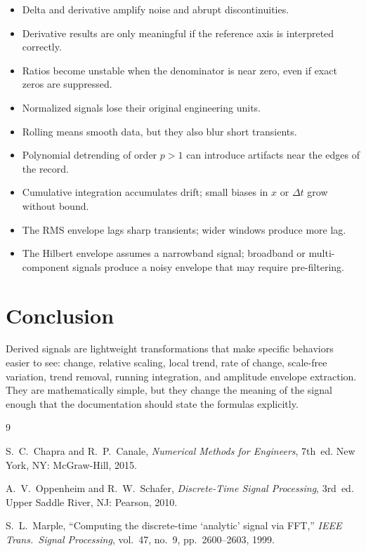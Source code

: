 \documentclass[11pt,a4paper]{article}
\begin{document}
\begin{itemize}
    \item Delta and derivative amplify noise and abrupt discontinuities.
    \item Derivative results are only meaningful if the reference axis is interpreted correctly.
    \item Ratios become unstable when the denominator is near zero, even if exact zeros are suppressed.
    \item Normalized signals lose their original engineering units.
    \item Rolling means smooth data, but they also blur short transients.
    \item Polynomial detrending of order $p > 1$ can introduce artifacts near the edges of the record.
    \item Cumulative integration accumulates drift; small biases in $x$ or $\Delta t$ grow without bound.
    \item The RMS envelope lags sharp transients; wider windows produce more lag.
    \item The Hilbert envelope assumes a narrowband signal; broadband or multi-component signals produce a noisy envelope that may require pre-filtering.
\end{itemize}

\section{Conclusion}

Derived signals are lightweight transformations that make specific behaviors easier to see: change, relative scaling, local trend, rate of change, scale-free variation, trend removal, running integration, and amplitude envelope extraction. They are mathematically simple, but they change the meaning of the signal enough that the documentation should state the formulas explicitly.

\begin{thebibliography}{9}

S.~C.~Chapra and R.~P.~Canale,
\emph{Numerical Methods for Engineers}, 7th~ed.
New York, NY: McGraw-Hill, 2015.

A.~V.~Oppenheim and R.~W.~Schafer,
\emph{Discrete-Time Signal Processing}, 3rd~ed.
Upper Saddle River, NJ: Pearson, 2010.

S.~L.~Marple,
``Computing the discrete-time `analytic' signal via FFT,''
\emph{IEEE Trans.\ Signal Processing}, vol.~47, no.~9, pp.~2600--2603, 1999.

\end{thebibliography}
\end{document}
